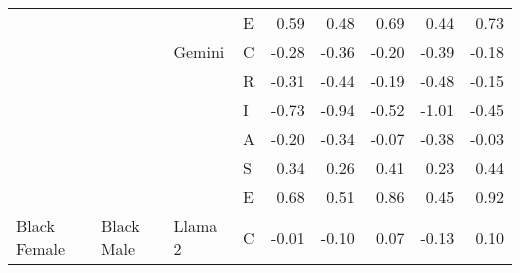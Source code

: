 \begin{table}
\begin{tabular}[t]{llllrrrrr}
 &  &  & E & 0.59 & 0.48 & 0.69 & 0.44 & 0.73\\

 &  & \multirow[t]{-6}{*}{\raggedright\arraybackslash Gemini} & C & -0.28 & -0.36 & -0.20 & -0.39 & -0.18\\

 &  &  & R & -0.31 & -0.44 & -0.19 & -0.48 & -0.15\\

 &  &  & I & -0.73 & -0.94 & -0.52 & -1.01 & -0.45\\

 &  &  & A & -0.20 & -0.34 & -0.07 & -0.38 & -0.03\\

 &  &  & S & 0.34 & 0.26 & 0.41 & 0.23 & 0.44\\

 &  &  & E & 0.68 & 0.51 & 0.86 & 0.45 & 0.92\\

\multirow[t]{-24}{*}{\raggedright\arraybackslash Black Female} & \multirow[t]{-24}{*}{\raggedright\arraybackslash Black Male} & \multirow[t]{-6}{*}{\raggedright\arraybackslash Llama 2} & C & -0.01 & -0.10 & 0.07 & -0.13 & 0.10\\
\bottomrule
\end{tabular}
\end{table}
